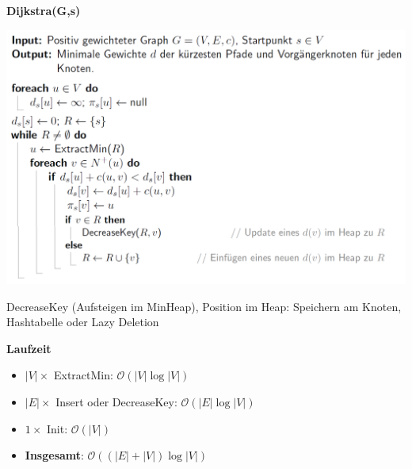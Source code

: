 \vspace{-4pt}
\begin{sectionbox}
\textbf{Dijkstra(G,s)}\par
\includegraphics[width = \columnwidth]{../img/Dijkstra.png}\par
\end{sectionbox}
\vspace{-4pt}
\begin{sectionbox}
DecreaseKey (Aufsteigen im MinHeap), Position im Heap: Speichern am Knoten, Hashtabelle oder Lazy Deletion\par\smallskip
\textbf{Laufzeit}\par
\begin{itemize}
    \item $|V| \times$ ExtractMin: $\mathcal{O}(|V| \log |V|)$
    \item $|E| \times$ Insert oder DecreaseKey: $\mathcal{O}(|E| \log |V|)$
    \item $1 \times$ Init: $\mathcal{O}(|V|)$
    \item \textbf{Insgesamt}: $\mathcal{O}((|E| + |V|)\log |V|)$
\end{itemize}

\end{sectionbox}
\vspace{-4pt}
